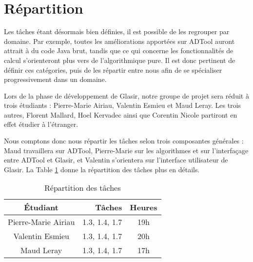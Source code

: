 \section{Répartition}
	\label{sec:repartition}

	Les tâches étant désormais bien définies, il est possible de les regrouper par domaine. Par exemple, toutes les améliorations apportées sur ADTool auront attrait à du code Java brut, tandis que ce qui concerne les fonctionnalités de calcul s'orienteront plus vers de l'algorithmique pure. Il est donc pertinent de définir ces catégories, puis de les répartir entre nous afin de se \og spécialiser \fg{} progressivement dans un domaine.
	
	Lors de la phase de développement de Glasir, notre groupe de projet sera réduit à trois étudiants : Pierre-Marie {\sc Airiau}, Valentin {\sc Esmieu} et Maud {\sc Leray}. Les trois autres, Florent {\sc Mallard}, Hoel {\sc Kervadec} ainsi que Corentin {\sc Nicole} partiront en effet étudier à l'étranger.
	
	Nous comptons donc nous répartir les tâches selon trois composantes générales : Maud travaillera sur ADTool, Pierre-Marie sur les algorithmes et sur l'interfaçage entre ADTool et Glasir, et Valentin s'orientera sur l'interface utilisateur de Glasir. La {\sc Table} \ref{table:repartition} donne la répartition des tâches plus en détails.
		
		\begin{table}[h]
			\centering
			\begin{tabular}{|c|r|c|}
				\hline
				\textbf{Étudiant} 			& \textbf{Tâches} 	& \textbf{Heures}\\
				\hline
				Pierre-Marie {\sc Airiau} 	&  1.3, 1.4, 1.7 	&	19h\\
				Valentin {\sc Esmieu} 		&  1.3, 1.4, 1.7 	&	20h\\
				Maud {\sc Leray} 			&  1.3, 1.4, 1.7 	&	17h\\
				\hline

			\end{tabular}
			\caption{Répartition des tâches}
			\label{table:repartition}
		\end{table}	
		